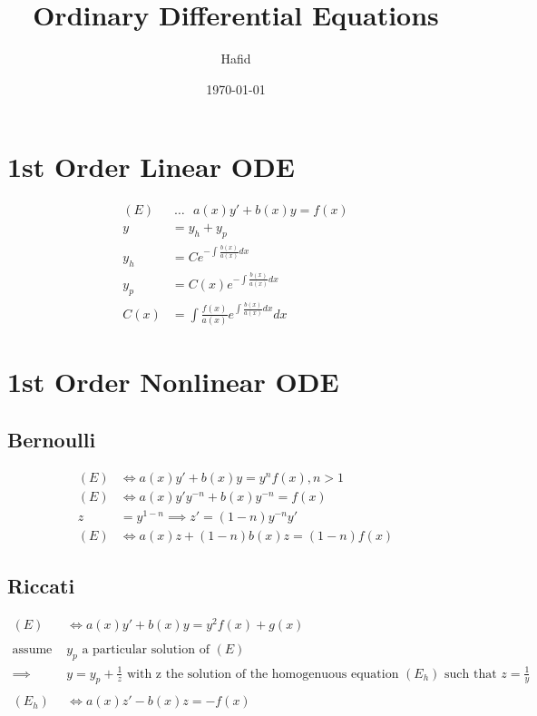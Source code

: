 \documentclass{article}
\title{Ordinary Differential Equations}
\author{Hafid}
\date{\today}
\begin{document}
\maketitle

\section{1st Order Linear ODE}

\begin{align*}
(E)  &\  \dots \ \ \ a(x)y' + b(x)y= f(x)\\
y    &= y_h + y_p\\
y_h  &= Ce^{-\int{\frac{b(x)}{a(x)}}dx}\\
y_p  &= C(x)e^{-\int{\frac{b(x)}{a(x)}}dx} \\
C(x) &= \int{\frac{f(x)}{a(x)}e^{\int{\frac{b(x)}{a(x)}}dx}dx}
\end{align*}

\section{1st Order Nonlinear ODE}

\subsection{Bernoulli}
\begin{align*}
(E) &\iff a(x)y' + b(x)y= y^n f(x) , n > 1\\
(E) &\iff a(x)y'y^{-n} + b(x)y^{-n} = f(x) \\
z   &= y^{1-n} \implies z'= (1-n)y^{-n}y'\\
(E) &\iff a(x)z + (1-n)b(x)z= (1-n)f(x)
\end{align*}

\subsection{Riccati}

\begin{align*}
(E) &\iff a(x)y' + b(x)y= y^2f(x) + g(x) \\ \\
\text{assume }&y_{p} \text{ a particular solution of }(E)\\ 
\implies& y = y_{p} + \frac{1}{z} \text{ with z the solution of the homogenuous equation }(E_{h}) \text{ such that }z = \frac{1}{y}\\ \\
(E_{h}) &\iff a(x)z' - b(x)z= -f(x)
\end{align*}
\end{document}
